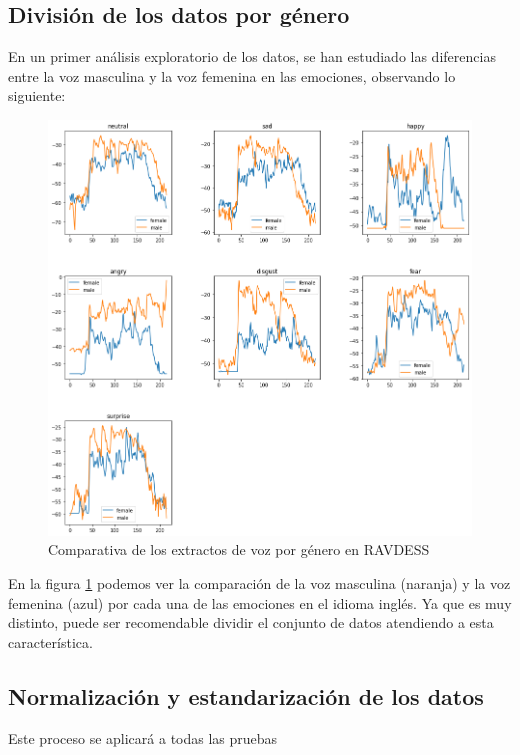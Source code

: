 \documentclass[11pt,a4paper,spanish]{book}
\begin{document}
	\subsection{División de los datos por género}
	\label{cap4:division}
	En un primer análisis exploratorio de los datos, se han estudiado las diferencias entre la voz masculina y la voz femenina en las emociones, observando lo siguiente:
	
	\begin{figure}[H]
		\centering
		\includegraphics[scale=0.35]{comparative_waveform.png} 
		\caption{Comparativa de los extractos de voz por género en RAVDESS}
		\label{fig:comp_emociones_genero}
	\end{figure}
	En la figura \ref{fig:comp_emociones_genero} podemos ver la comparación de la voz masculina (naranja) y la voz femenina (azul) por cada una de las emociones en el idioma inglés. Ya que es muy distinto, puede ser recomendable dividir el conjunto de datos atendiendo a esta característica.
	
	
	\subsection{Normalización y estandarización de los datos}
	Este proceso se aplicará a todas las pruebas

	
\end{document}
